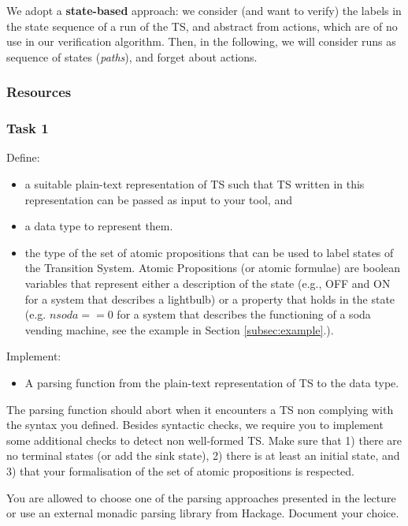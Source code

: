 \documentclass{article}
\begin{document}
We adopt a \textbf{state-based} approach: we consider (and want to verify) 
the labels in the state sequence of a run of the TS, and abstract from actions, 
which are of no use in our verification algorithm. Then, in the following, we will consider
runs as sequence of states (\emph{paths}), and forget about actions.

\subsubsection*{Resources}
\cite[Paragraph 2.1]{BaKa}

\color{red}
\subsubsection*{Task 1}
Define:
\begin{itemize}
    \item a suitable plain-text representation of TS such that TS written in this representation
          can be passed as input to your tool, and
    \item a data type to represent them. 
    \item the type of the set of atomic propositions that can be used to label states of the Transition System. 
            Atomic Propositions (or atomic formulae) are boolean variables that represent either
            a description of the state (e.g., OFF and ON for a system that describes a lightbulb) 
            or a property that holds in the state (e.g. $nsoda == 0$ for a system that describes the functioning 
            of a soda vending machine, see the example in Section \ref{subsec:example}.).
\end{itemize} 
Implement: 
\begin{itemize}
    \item A parsing function from the plain-text representation of TS to the data type.
\end{itemize}
The parsing function should abort when it encounters a TS non complying with the syntax you defined.
Besides syntactic checks, we require you to implement some additional checks to detect 
non well-formed TS. Make sure that 1) there are no terminal states (or add the sink state),
2) there is at least an initial state,
and 3) that your formalisation of the set of atomic propositions is respected. 

\color{black}

You are allowed to choose one of the parsing approaches presented in the lecture or 
use an external monadic parsing library from Hackage. Document your choice.
\end{document}
